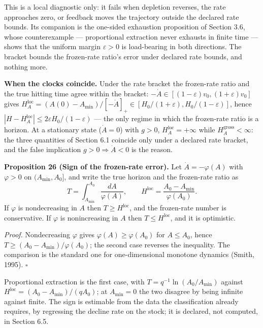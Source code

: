 \documentclass[11pt]{article}
\begin{document}
This is a local diagnostic only: it fails when depletion reverses, the
rate approaches zero, or feedback moves the trajectory outside the
declared rate bounds. Its companion is the one-sided exhaustion
proposition of Section 3.6, whose counterexample --- proportional
extraction never exhausts in finite time --- shows that the uniform
margin \(\varepsilon > 0\) is load-bearing in both directions. The
bracket bounds the frozen-rate ratio's error under declared rate bounds,
and nothing more.

\textbf{When the clocks coincide.} Under the rate bracket the
frozen-rate ratio and the true hitting time agree within the bracket:
\(-\dot A \in [(1-\varepsilon)v_0, (1+\varepsilon)v_0]\) gives
\(H_A^{\mathrm{loc}} = (A(0) - A_{\min})/[-\dot A]_+ \in [H_0/(1+\varepsilon), H_0/(1-\varepsilon)]\),
hence \(|H - H_A^{\mathrm{loc}}| \le 2\varepsilon H_0/(1-\varepsilon)\)
--- the only regime in which the frozen-rate ratio is a horizon. At a
stationary state (\(\dot A = 0\)) with \(g > 0\),
\(H_A^{\mathrm{loc}} = +\infty\) while
\(H_A^{\mathrm{gross}} < \infty\): the three quantities of Section 6.1
coincide only under a declared rate bracket, and the false implication
\(g > 0 \Rightarrow \dot A < 0\) is the reason.

\textbf{Proposition 26 (Sign of the frozen-rate error).} Let \(\dot A=-\varphi(A)\) with \(\varphi>0\) on
\((A_{\min},A_0]\), and write the true horizon and the frozen-rate ratio as
\[ T=\int_{A_{\min}}^{A_0}\frac{dA}{\varphi(A)}, \qquad H^{\mathrm{loc}}=\frac{A_0-A_{\min}}{\varphi(A_0)} . \]
If \(\varphi\) is nondecreasing in \(A\) then \(T\ge H^{\mathrm{loc}}\), and the frozen-rate number
is conservative. If \(\varphi\) is nonincreasing in \(A\) then \(T\le H^{\mathrm{loc}}\), and it is
optimistic.

\emph{Proof.} Nondecreasing \(\varphi\) gives \(\varphi(A)\ge\varphi(A_0)\) for \(A\le A_0\), hence
\(T\ge(A_0-A_{\min})/\varphi(A_0)\); the second case reverses the inequality. The comparison is the
standard one for one-dimensional monotone dynamics (Smith, 1995). \ensuremath{\square}

Proportional extraction is the first case, with \(T=q^{-1}\ln(A_0/\allowbreak{}A_{\min})\) against
\(H^{\mathrm{loc}}=(A_0-A_{\min})/(qA_0)\); at \(A_{\min}=0\) the two disagree by being infinite
against finite. The sign is estimable from the data the classification already requires, by
regressing the decline rate on the stock; it is declared, not computed, in Section 6.5.
\end{document}
